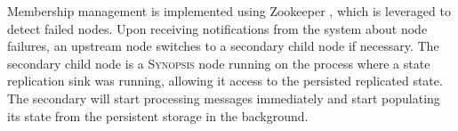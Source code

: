 Membership management is implemented using Zookeeper \cite{hunt2010zookeeper}, which is leveraged to detect failed nodes.
Upon receiving notifications from the system about node failures, an upstream node switches to a secondary child node if necessary. The secondary child node is a \textsc{Synopsis} node running on the process where a state replication sink was running, allowing it access to the persisted replicated state.
The secondary will start processing messages immediately and start populating its state from the persistent storage in the background.

